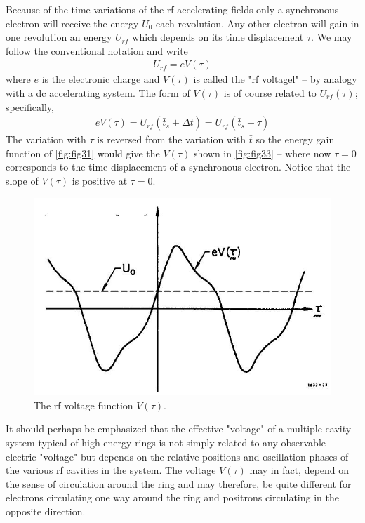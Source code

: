Because of the time variations of the rf accelerating fields only a synchronous electron will receive the energy $U_0$ each revolution. Any other electron will gain in one revolution an energy $U_{rf}$ which depends on its time displacement $\tau$. We may follow the conventional notation and write
\begin{align}
	U_{rf} = eV(\tau)
\end{align}
where $e$ is the electronic charge and $V(\tau)$ is called the "rf voltagel" -- by analogy with a dc accelerating system. The form of $V(\tau)$ is of course related to $U_{rf}(\tau)$; specifically,
\begin{align}
	eV(\tau) = U_{rf}(\bar{t}_s + \Delta t) = U_{rf}(\bar{t}_s - \tau)
\end{align}
The variation with $\tau$ is reversed from the variation with $\bar{t}$ so the energy gain function of \autoref{fig:fig31} would give the $V(\tau)$ shown in \autoref{fig:fig33} -- where now $\tau = 0$ corresponds to the time displacement of a synchronous electron. Notice that the slope of $V(\tau)$ is positive at $\tau = 0$.

\begin{figure}[!htb]
	\centering
	\includegraphics[width=0.6\linewidth]{./Figuras/fig33.jpeg}
	\caption{The rf voltage function $V(\tau)$.}
	\label{fig:fig33}
\end{figure}

It should perhaps be emphasized that the effective "voltage" of a multiple cavity system typical of high energy rings is not simply related to any observable electric "voltage" but depends on the relative positions and oscillation phases of the various rf cavities in the system. The voltage $V(\tau)$ may in fact, depend on the sense of circulation around the ring and may therefore, be quite different for electrons circulating one way around the ring and positrons circulating in the opposite direction.


